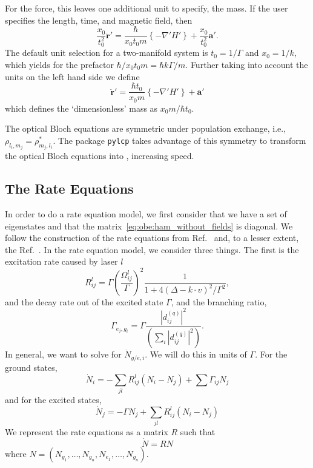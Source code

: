 \documentclass[final,5p,times,twocolumn]{elsarticle}
\newcounter{bla}
\begin{document}
For the force, this leaves one additional unit to specify, the mass.  If the
user specifies the length, time, and magnetic field, then
\begin{equation}
    \frac{x_0}{t_0^2} \ddot{\mathbf{r}}' = \frac{\hbar}{x_0 t_0 m}\left\{ -\nabla' H'\right\} + \frac{x_0}{t_0^2}\mathbf{a}'.
\end{equation}
The default unit selection for a two-manifold system is $t_0=1/\Gamma$ and $x_0=1/k$, which yields for the prefactor $\hbar/x_0 t_0 m = \hbar k \Gamma/m$.   Further taking into account the units on the left hand side we define
\begin{equation}
	\ddot{\mathbf{r}}' = \frac{\hbar t_0}{x_0 m}\left\{ -\nabla' H'\right\} + \mathbf{a}'
\end{equation}
which defines the `dimensionless' mass as $x_0 m/\hbar t_0$.






The optical Bloch equations are symmetric under population exchange, i.e., $\rho_{l_i, m_j} = \rho^*_{m_j, l_i}$.  The package {\tt pylcp} takes advantage of this symmetry to transform the optical Bloch equations into , increasing speed.

\subsection{The Rate Equations}
In order to do a rate equation model, we first consider that we have a set of
eigenstates and that the matrix~\ref{eq:obe:ham_without_fields} is diagonal.  We
follow the construction of the rate equations from Ref.~\cite{Tarbutt2015} and,
to a lesser extent, the Ref.~\cite{Tollett1995}.
In the rate equation model, we consider three things.  The first is the
excitation rate caused by laser $l$
\begin{equation}
    \label{eq:lcp:scattering_rate}
    R^l_{ij} = \Gamma \left(\frac{\Omega^l_{ij}}{\Gamma}\right)^2\frac{1}{1 + 4(\Delta - k\cdot v)^2/\Gamma^2},
\end{equation}
and the decay rate out of the excited state $\Gamma$, and the branching ratio,
\begin{equation}
    \Gamma_{e_j,g_i} = \Gamma \frac{\left|d^{(q)}_{ij}\right|^2}{\left(\sum_i \left|d^{(q)}_{ij}\right|^2\right)}.
\end{equation}
In general, we want to solve for $\dot{N}_{g/e,i}$.  We will do this in units of
$\Gamma$.  For the ground states,
\begin{equation}
    \dot{N}_i = -\sum_{jl} R^l_{ij} (N_i - N_j) + \sum \Gamma_{ij}N_j
\end{equation}
and for the excited states,
\begin{equation}
    \dot{N}_j = - \Gamma N_j + \sum_{jl} R^l_{ij} (N_i - N_j)
\end{equation}
We represent the rate equations as a matrix $R$ such that
\begin{equation}
    \dot{N} = R N
\end{equation}
where $N = (N_{g_1},\dots, N_{g_n}, N_{e_1}, \dots, N_{g_n})$.
\end{document}
